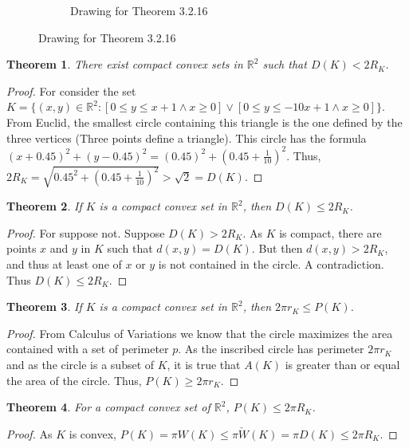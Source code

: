 \documentclass[12pt,oneside]{book}
\theoremstyle{mystyle}
\newtheorem{theorem}{Theorem}[section]
\begin{document}
\begin{figure}[H]
\begin{subfigure}[b]{0.49\textwidth}
    \caption{Drawing for Theorem 3.2.16}
  \end{subfigure}
\end{figure}


\begin{theorem}
There exist compact convex sets in $\mathbb{R}^2$ such that $D(K) < 2R_K$.
\end{theorem}
\begin{proof}
For consider the set $K=\{(x,y)\in \mathbb{R}^2: [0\leq y\leq x+1 \land x\geq 0]\lor [0\leq y\leq -10x+1\land x\geq 0]\}$. From Euclid, the smallest circle containing this triangle is the one defined by the three vertices (Three points define a triangle). This circle has the formula $(x+0.45)^2+(y-0.45)^2 = (0.45)^2 +(0.45+\frac{1}{10})^2$. Thus, $2R_K = \sqrt{0.45^2 +(0.45+\frac{1}{10})^2} > \sqrt{2} = D(K)$.
\end{proof}

\begin{theorem}
If $K$ is a compact convex set in $\mathbb{R}^2$, then $D(K) \leq 2R_K$.
\end{theorem}
\begin{proof}
For suppose not. Suppose $D(K) > 2R_K$. As $K$ is compact, there are points $x$ and $y$ in $K$ such that $d(x,y)=D(K)$. But then $d(x,y)>2R_K$, and thus at least one of $x$ or $y$ is not contained in the circle. A contradiction. Thus $D(K)\leq 2R_K$.
\end{proof}

\begin{theorem}
If $K$ is a compact convex set in $\mathbb{R}^2$, then $2\pi r_K \leq P(K)$.
\end{theorem}
\begin{proof}
From Calculus of Variations we know that the circle maximizes the area contained with a set of perimeter $p$. As the inscribed circle has perimeter $2\pi r_K$ and as the circle is a subset of $K$, it is true that $A(K)$ is greater than or equal the area of the circle. Thus, $P(K)\geq 2\pi r_K$.
\end{proof}

\begin{theorem}
For a compact convex set of $\mathbb{R}^2$, $P(K) \leq 2\pi R_K$.
\end{theorem}
\begin{proof}
As $K$ is convex, $P(K) = \pi W(K) \leq \pi \check{W}(K) = \pi D(K) \leq 2\pi R_K$.
\end{proof}
\end{document}
